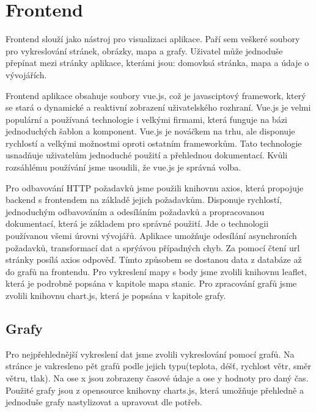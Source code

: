 \section{Frontend} \label{frontend}
Frontend slouží jako nástroj pro visualizaci aplikace. Paří sem veškeré soubory pro vykreslování stránek, obrázky, mapa a grafy. Uživatel může jednoduše přepínat mezi stránky aplikace, kterámi jsou: domovksá stránka, mapa a údaje o vývojářích.

Frontend aplikace obsahuje soubory vue.js, což je javasciptový framework, který se stará o dynamické a reaktivní zobrazení uživatelského rozhraní. Vue.js je velmi populární a používaná technologie i velkými firmami, která funguje na bázi jednoduchých šablon a komponent.
Vue.js je nováčkem na trhu, ale disponuje rychlostí a velkými možnostmi oproti ostatním frameworkům.
Tato technologie usnadňuje uživatelům jednoduché použití a přehlednou dokumentací. Kvůli rozsáhlému používání jsme usoudili, že vue.js je správná volba. 

Pro odbavování HTTP požadavků jsme použili knihovnu axios, která propojuje backend s frontendem na základě jejich požadavkům. Disponuje rychlostí, jednoduchým odbavováním a odesíláním požadavků a propracovanou dokumentací, která je základem pro správné použití.
Jde o technologii používanou všemi úrovni vývojářů. Aplikace umožňuje odesílání asynchroních požadavků, transformací dat a sprýávou případných chyb.
Za pomocí čtení url stránky posílá axios odpověď. Tímto způsobem se dostanou data z databáze až do grafů na frontendu. 
Pro vykreslení mapy s body jsme zvolili knihovnu leaflet, která je podrobně popsána v kapitole mapa stanic. Pro zpracování grafů jsme zvolili knihovnu chart.js, která je popsána v kapitole grafy.

\subsection{Grafy}
Pro nejpřehlednější vykreslení dat jsme zvolili vykreslování pomocí grafů. Na stránce je vakresleno pět grafů podle jejich typu(teplota, déšť, rychlost větr, směr větru, tlak). %
Na ose x jsou zobrazeny časové údaje a ose y hodnoty pro daný čas. Použité grafy jsou z opensource knihovny charts.js, která umožňuje přehledně a jednoduše grafy nastylizovat a upravovat dle potřeb.

